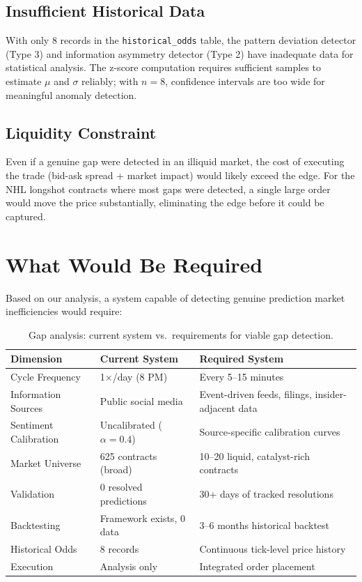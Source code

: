 \documentclass[12pt, letterpaper]{article}
\begin{document}
\subsection{Insufficient Historical Data}

With only 8 records in the \texttt{historical\_odds} table, the pattern deviation detector (Type 3) and information asymmetry detector (Type 2) have inadequate data for statistical analysis. The z-score computation requires sufficient samples to estimate $\mu$ and $\sigma$ reliably; with $n = 8$, confidence intervals are too wide for meaningful anomaly detection.

\subsection{Liquidity Constraint}

Even if a genuine gap were detected in an illiquid market, the cost of executing the trade (bid-ask spread + market impact) would likely exceed the edge. For the NHL longshot contracts where most gaps were detected, a single large order would move the price substantially, eliminating the edge before it could be captured.

\section{What Would Be Required}
\label{sec:required}

Based on our analysis, a system capable of detecting genuine prediction market inefficiencies would require:

\begin{table}[H]
\centering
\caption{Gap analysis: current system vs.\ requirements for viable gap detection.}
\label{tab:gap_analysis}
\begin{tabular}{@{}p{3.5cm}p{4.5cm}p{4.5cm}@{}}
\toprule
\textbf{Dimension} & \textbf{Current System} & \textbf{Required System} \\
\midrule
Cycle Frequency & 1$\times$/day (8 PM) & Every 5--15 minutes \\
Information Sources & Public social media & Event-driven feeds, filings, insider-adjacent data \\
Sentiment Calibration & Uncalibrated ($\alpha = 0.4$) & Source-specific calibration curves \\
Market Universe & 625 contracts (broad) & 10--20 liquid, catalyst-rich contracts \\
Validation & 0 resolved predictions & 30+ days of tracked resolutions \\
Backtesting & Framework exists, 0 data & 3--6 months historical backtest \\
Historical Odds & 8 records & Continuous tick-level price history \\
Execution & Analysis only & Integrated order placement \\
\bottomrule
\end{tabular}
\end{table}
\end{document}
